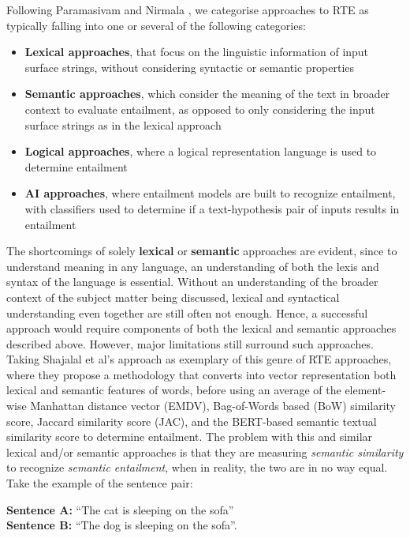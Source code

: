 \documentclass[12pt,twoside]{report}
\begin{document}
Following Paramasivam and Nirmala \cite{PARAMASIVAM20229644}, we categorise approaches to RTE as typically falling into one or several of the following categories:
\begin{itemize}[itemsep=0pt]
    \item \textbf{Lexical approaches}, that focus on the linguistic information of input surface strings, without considering syntactic or semantic properties
    \item \textbf{Semantic approaches}, which consider the meaning of the text in broader context to evaluate entailment, as opposed to only considering the input surface strings as in the lexical approach
    \item \textbf{Logical approaches}, where a logical representation language is used to determine entailment
    \item \textbf{AI approaches}, where entailment models are built to recognize entailment, with classifiers used to determine if a text-hypothesis pair of inputs results in entailment 
\end{itemize}

The shortcomings of solely \textbf{lexical} or \textbf{semantic} approaches are evident, since to understand meaning in any language, an understanding of both the lexis and syntax of the language is essential. Without an understanding of the broader context of the subject matter being discussed, lexical and syntactical understanding even together are still often not enough. Hence, a successful approach would require components of both the lexical and semantic approaches described above. However, major limitations still surround such approaches. Taking Shajalal et al's \cite{shajalal} approach as exemplary of this genre of RTE approaches, where they propose a methodology that converts into vector representation both lexical and semantic features of words, before using an average of the element-wise Manhattan distance vector (EMDV), Bag-of-Words based (BoW) similarity score, Jaccard similarity score (JAC), and the BERT-based semantic textual similarity score to determine entailment. The problem with this and similar lexical and/or semantic approaches is that they are measuring \textit{semantic similarity} to recognize \textit{semantic entailment}, when in reality, the two are in no way equal. Take the example of the sentence pair:
\begin{flushleft}
    \textbf{Sentence A:} ``The cat is sleeping on the sofa''\\
    \textbf{Sentence B:} ``The dog is sleeping on the sofa''. 
\end{flushleft}
\end{document}
